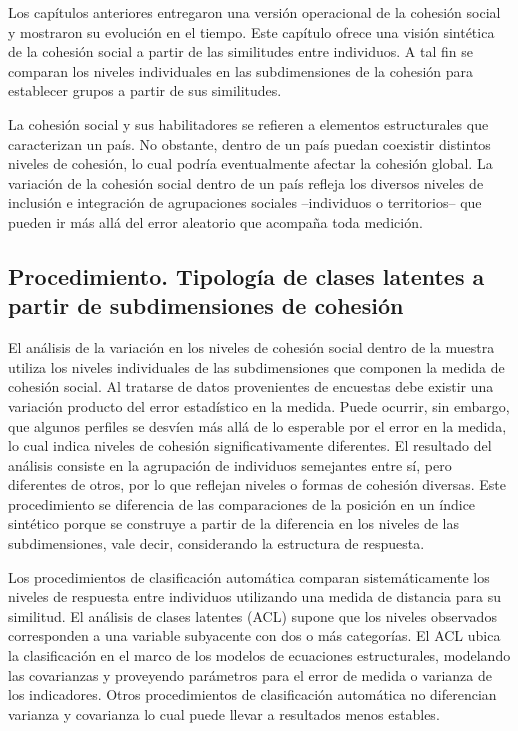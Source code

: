 \documentclass[
  12pt,
]{book}
\begin{document}
Los capítulos anteriores entregaron una versión operacional de la cohesión social y mostraron su evolución en el tiempo. Este capítulo ofrece una visión sintética de la cohesión social a partir de las similitudes entre individuos. A tal fin se comparan los niveles individuales en las subdimensiones de la cohesión para establecer grupos a partir de sus similitudes.

La cohesión social y sus habilitadores se refieren a elementos estructurales que caracterizan un país. No obstante, dentro de un país puedan coexistir distintos niveles de cohesión, lo cual podría eventualmente afectar la cohesión global. La variación de la cohesión social dentro de un país refleja los diversos niveles de inclusión e integración de agrupaciones sociales --individuos o territorios-- que pueden ir más allá del error aleatorio que acompaña toda medición.

\hypertarget{procedimiento.-tipologuxeda-de-clases-latentes-a-partir-de-subdimensiones-de-cohesiuxf3n}{%
\subsection{Procedimiento. Tipología de clases latentes a partir de subdimensiones de cohesión}\label{procedimiento.-tipologuxeda-de-clases-latentes-a-partir-de-subdimensiones-de-cohesiuxf3n}}

El análisis de la variación en los niveles de cohesión social dentro de la muestra utiliza los niveles individuales de las subdimensiones que componen la medida de cohesión social. Al tratarse de datos provenientes de encuestas debe existir una variación producto del error estadístico en la medida. Puede ocurrir, sin embargo, que algunos perfiles se desvíen más allá de lo esperable por el error en la medida, lo cual indica niveles de cohesión significativamente diferentes. El resultado del análisis consiste en la agrupación de individuos semejantes entre sí, pero diferentes de otros, por lo que reflejan niveles o formas de cohesión diversas. Este procedimiento se diferencia de las comparaciones de la posición en un índice sintético porque se construye a partir de la diferencia en los niveles de las subdimensiones, vale decir, considerando la estructura de respuesta.

Los procedimientos de clasificación automática comparan sistemáticamente los niveles de respuesta entre individuos utilizando una medida de distancia para su similitud. El análisis de clases latentes (ACL) supone que los niveles observados corresponden a una variable subyacente con dos o más categorías. El ACL ubica la clasificación en el marco de los modelos de ecuaciones estructurales, modelando las covarianzas y proveyendo parámetros para el error de medida o varianza de los indicadores. Otros procedimientos de clasificación automática no diferencian varianza y covarianza lo cual puede llevar a resultados menos estables.
\end{document}
